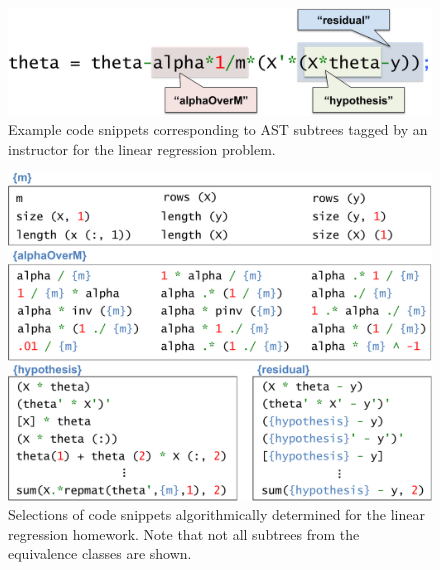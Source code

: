 \begin{figure}[t!]
\center
\includegraphics[width=.35\textwidth]{img/taggingexample.pdf}
\caption[Example tagged code]{
Example code snippets corresponding to AST subtrees tagged by an instructor for the linear regression problem.
}
\label{fig:tagging}
\end{figure}

\begin{figure}[t!]
\center
\includegraphics[width=.68\textwidth]{img/equivalencesAll.pdf}

\caption[Resulting equivalence classes]{
 Selections of code snippets algorithmically determined for the linear regression homework.  Note that not all subtrees from the equivalence classes are shown.
}
\label{fig:equivalences}
\end{figure}

